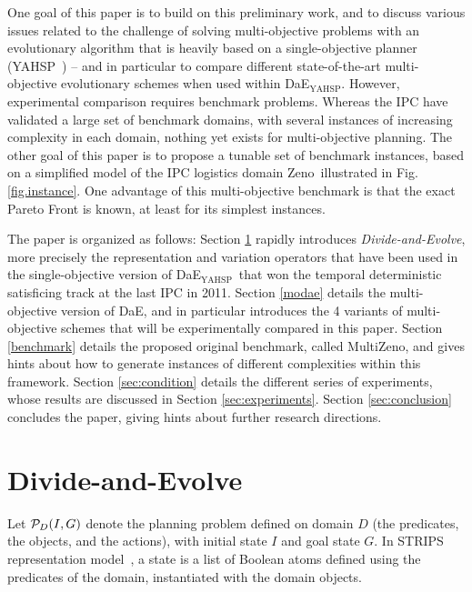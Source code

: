 \documentclass{llncs}
\def\dae{{\em Divide-and-Evolve}}
\def\DAE{{\sc DaE}}
\newcommand{\DAEYAHSP}{{\sc DaE$_{\text{YAHSP}}$}}
\def\YAHSP{{\sc YAHSP}}
\def\ZENO{{\sc Zeno}}
\def\MULTIZENO{{\sc MultiZeno}}
\begin{document}
One goal of this paper is to build on this preliminary work, and to discuss various issues related to the challenge of solving multi-objective problems with an evolutionary algorithm that is heavily based on a single-objective planner (\YAHSP\ \cite{Vidal2004}) -- and in particular to compare different state-of-the-art multi-objective evolutionary schemes when used within \DAEYAHSP.
However, experimental comparison requires benchmark problems. Whereas the IPC have validated a large set of benchmark domains, with several instances of increasing complexity in each domain, nothing yet exists for multi-objective planning. The other goal of this paper is to propose a tunable set of benchmark instances, based on a simplified model of the IPC logistics domain \ZENO\ illustrated in Fig. \ref{fig.instance}. One advantage of this multi-objective benchmark is that the exact Pareto Front is known, at least for its simplest instances.
 
The paper is organized as follows: Section \ref{sec:dae} rapidly introduces \dae, more precisely the representation and variation operators that have been used in the single-objective version of \DAEYAHSP\ that won the temporal deterministic satisficing track at the last IPC in 2011. 
Section \ref{modae} details the multi-objective version of \DAE, and in particular introduces the 4 variants of multi-objective schemes that will be experimentally compared in this paper.
Section \ref{benchmark} details the proposed original benchmark, called \MULTIZENO, and gives hints about how to generate instances of different complexities within this framework. Section \ref{sec:condition} details the different series of experiments, whose results are discussed in Section \ref{sec:experiments}. Section \ref{sec:conclusion} concludes the paper, giving hints about further research directions.


\section{Divide-and-Evolve}
\label{sec:dae}
Let ${\cal P}_D(I,G)$ denote the planning problem defined on domain $D$ (the predicates, the objects, and the actions), with initial state $I$ and goal state $G$. In STRIPS representation model~\cite{Fikes1971}, a state is a list of Boolean atoms defined using the predicates of the domain, instantiated with the domain objects.  
\end{document}
